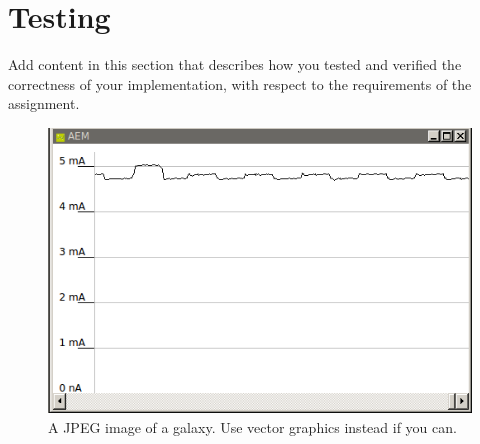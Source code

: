 \subsubsection{}

\section{Testing}
Add content in this section that describes how you tested and verified the correctness of your implementation, with respect to the requirements of the assignment.
\begin{figure}
\centering
\includegraphics[scale=1]{images/Idle_preEF.PNG}
\caption{A JPEG image of a galaxy. Use vector graphics instead if you can.}
\label{fig:universe}
\end{figure}
